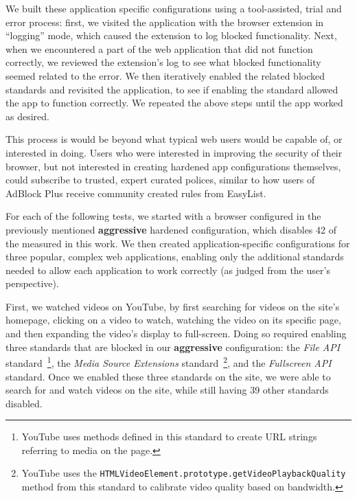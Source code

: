 We built these application specific configurations using a tool-assisted,
trial and error process: first, we visited the application with the browser
extension in ``logging'' mode,
which caused the extension to log blocked functionality.  Next,
when we encountered a part of the web application that did not function correctly,
we reviewed the extension's log to see what blocked functionality seemed
related to the error.  We then iteratively enabled the related blocked
standards and revisited the application, to see if enabling the standard
allowed the app to function correctly.  We repeated the above steps
until the app worked as desired.

This process is would be beyond what typical web users would be
capable of, or interested in doing.  Users who were interested in improving the
security of their browser, but not interested in creating hardened app
configurations themselves, could subscribe to trusted, expert curated polices,
similar to how users of AdBlock Plus receive community created rules from
EasyList.

For each of the following tests, we started with a browser configured in
the previously mentioned \textbf{aggressive} hardened configuration, 
which disables 42 of the \NumStandards \WASs measured in this work.  We then created
application-specific configurations for three popular, complex web applications,
enabling only the additional standards needed to allow each application
to work correctly (as judged from the user's perspective).

First, we watched videos on YouTube, by first searching for videos on the
site's homepage, clicking on a video to watch, watching the video on its
specific page, and then expanding the video's display to full-screen.
Doing so required enabling three standards that are blocked in our 
\textbf{aggressive} configuration: the \textit{File API} standard~\footnote{YouTube
uses methods defined in this standard to create URL strings referring to media on the
page.}, the \textit{Media Source Extensions} standard~\footnote{YouTube uses the
\texttt{HTMLVideoElement.prototype.getVideoPlaybackQuality} method from this
standard to calibrate video quality based on bandwidth.}, and the
\textit{Fullscreen API} standard. Once we enabled these three standards on the
site, we were able to search for and watch videos on the site, while still
having 39 other standards disabled.

